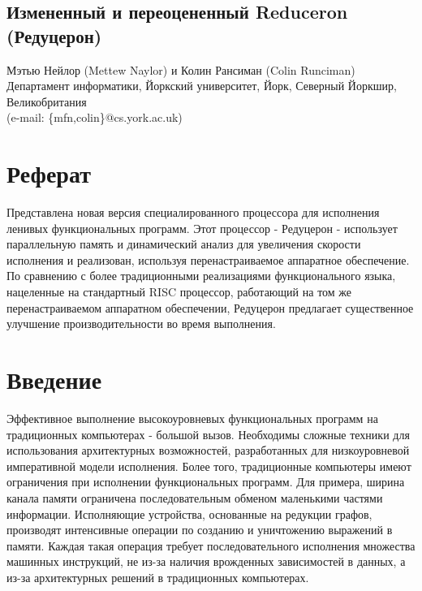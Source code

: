 \documentclass[14pt]{extarticle}
\begin{document}
\begin{center}
\section*{Измененный и переоцененный Reduceron (Редуцерон)}
\end{center}
\begin{center}
Мэтью Нейлор (Mettew Naylor) и Колин Рансиман (Colin Runciman) \\
Департамент информатики, Йоркский университет, Йорк, Северный Йоркшир, Великобритания \\
(e-mail: \{mfn,colin\}@cs.york.ac.uk)
\end{center}

\section{Реферат}
Представлена новая версия специалированного процессора для исполнения ленивых функциональных программ. Этот процессор - Редуцерон - использует параллельную память и динамический анализ для увеличения скорости исполнения и реализован, используя перенастраиваемое аппаратное обеспечение. По сравнению с более традиционными реализациями функционального языка, нацеленные на стандартный RISC процессор, работающий на том же перенастраиваемом аппаратном обеспечении, Редуцерон предлагает существенное улучшение производительности во время выполнения.

\section{Введение}
Эффективное выполнение высокоуровневых функциональных программ на традиционных компьютерах - большой вызов. Необходимы сложные техники для использования архитектурных возможностей, разработанных для низкоуровневой императивной модели исполнения. Более того, традиционные компьютеры имеют ограничения при исполнении функциональных программ. Для примера, ширина канала памяти ограничена последовательным обменом маленькими частями информации. Исполняющие устройства, основанные на редукции графов, производят интенсивные операции по созданию и уничтожению выражений в памяти. Каждая такая операция требует последовательного исполнения множества машинных инструкций, не из-за наличия врожденных зависимостей в данных, а из-за архитектурных решений в традиционных компьютерах.
\end{document}
